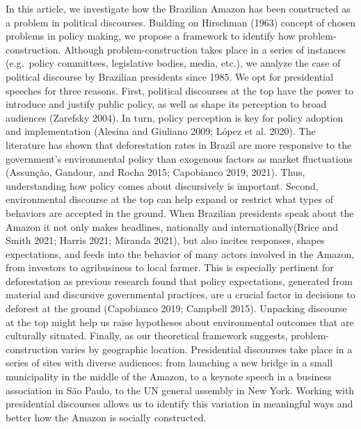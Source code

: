 \documentclass[
]{article}
\begin{document}
In this article, we investigate how the Brazilian Amazon has been
constructed as a problem in political discourses. Building on Hirschman
(1963) concept of chosen problems in policy making, we propose a
framework to identify how problem-construction. Although
problem-construction takes place in a series of instances (e.g.~policy
committees, legislative bodies, media, etc.), we analyze the case of
political discourse by Brazilian presidents since 1985. We opt for
presidential speeches for three reasons. First, political discourses at
the top have the power to introduce and justify public policy, as well
as shape its perception to broad audiences (Zarefsky 2004). In turn,
policy perception is key for policy adoption and implementation (Alesina
and Giuliano 2009; López et al. 2020). The literature has shown that
deforestation rates in Brazil are more responsive to the government's
environmental policy than exogenous factors as market fluctuations
(Assunção, Gandour, and Rocha 2015; Capobianco 2019, 2021). Thus,
understanding how policy comes about discursively is important. Second,
environmental discourse at the top can help expand or restrict what
types of behaviors are accepted in the ground. When Brazilian presidents
speak about the Amazon it not only makes headlines, nationally and
internationally(Brice and Smith 2021; Harris 2021; Miranda 2021), but
also incites responses, shapes expectations, and feeds into the behavior
of many actors involved in the Amazon, from investors to agribusiness to
local farmer. This is especially pertinent for deforestation as previous
research found that policy expectations, generated from material and
discursive governmental practices, are a crucial factor in decisions to
deforest at the ground (Capobianco 2019; Campbell 2015). Unpacking
discourse at the top might help us raise hypotheses about environmental
outcomes that are culturally situated. Finally, as our theoretical
framework suggests, problem-construction varies by geographic location.
Presidential discourses take place in a series of sites with diverse
audiences: from launching a new bridge in a small municipality in the
middle of the Amazon, to a keynote speech in a business association in
São Paulo, to the UN general assembly in New York. Working with
presidential discourses allows us to identify this variation in
meaningful ways and better how the Amazon is socially constructed.
\end{document}
